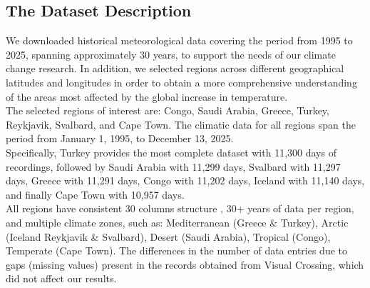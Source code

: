\documentclass[12pt]{Definitions/academia}
\begin{document}
\subsection{\textmd{The Dataset Description}}
\vspace{-2em}
We downloaded historical meteorological data covering the period from
1995 to 2025, spanning approximately 30 years, to support the needs
of our climate change research. In addition, we selected regions across
different geographical latitudes and longitudes in order to obtain
a more comprehensive understanding of the areas most affected by the
global increase in temperature.\\
 The selected regions of interest are:
Congo, Saudi Arabia, Greece, Turkey, Reykjavik, Svalbard, and Cape
Town. The climatic data for all regions span the period from January
1, 1995, to December 13, 2025.\\
 Specifically, Turkey provides the most
complete dataset with 11,300 days of recordings, followed by Saudi
Arabia with 11,299 days, Svalbard with 11,297 days, Greece with 11,291
days, Congo with 11,202 days, Iceland with 11,140 days, and finally
Cape Town with 10,957 days. \\
All regions have consistent 30 columns
structure , 30+ years of data per
region, and multiple climate zones, such as: Mediterranean (Greece
\& Turkey), Arctic (Iceland Reykjavik \& Svalbard), Desert (Saudi
Arabia), Tropical (Congo), Temperate (Cape Town). The differences
in the number of data entries  due to gaps (missing values) present
in the records obtained from Visual Crossing, which did not affect
our results.
\end{document}
